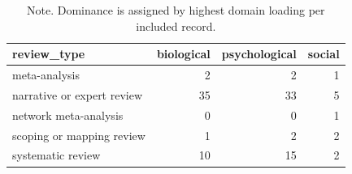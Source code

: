 \begin{table}[htbp]
\raggedright
\caption{Dominant semantic domain by review type.}
\label{tab.semantic.dominance}
\begin{tabular}{lrrr}
\toprule
review\_type & biological & psychological & social \\
\midrule
meta-analysis & 2 & 2 & 1 \\
narrative or expert review & 35 & 33 & 5 \\
network meta-analysis & 0 & 0 & 1 \\
scoping or mapping review & 1 & 2 & 2 \\
systematic review & 10 & 15 & 2 \\
\bottomrule
\end{tabular}

\caption*{Note. Dominance is assigned by highest domain loading per included record.}
\end{table}
